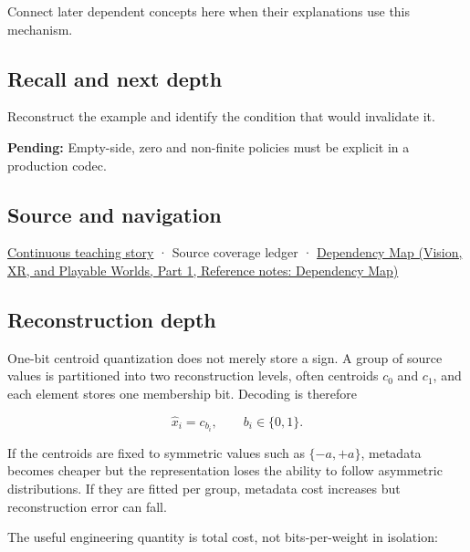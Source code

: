 Connect later dependent concepts here when their explanations use this mechanism.

\subsection{Recall and next depth}\label{appendix-4ccd7a775813-recall-and-next-depth}

\hypertarget{appendix-4ccd7a775813-recall-and-next-depth}{}

Reconstruct the example and identify the condition that would invalidate it.

\textbf{Pending:} Empty-side, zero and non-finite policies must be explicit in a production codec.

\subsection{Source and navigation}\label{appendix-4ccd7a775813-source-and-navigation}

\hypertarget{appendix-4ccd7a775813-source-and-navigation}{}

\hyperref[01-foundations-i-ch001-choosing-what-information-to-keep]{Continuous teaching story} · {Source coverage ledger} · \href{../07-Vision-XR-and-Playable-Worlds-P01/main.pdf\#nameddest=appendix-4ad47bdd269a}{Dependency Map (Vision, XR, and Playable Worlds, Part 1, Reference notes: Dependency Map)}

\subsection{Reconstruction depth}\label{appendix-4ccd7a775813-reconstruction-depth}

\hypertarget{appendix-4ccd7a775813-reconstruction-depth}{}

One-bit centroid quantization does not merely store a sign. A group of source values is partitioned into two reconstruction levels, often centroids \(c_0\) and \(c_1\), and each element stores one membership bit. Decoding is therefore

\[
\hat x_i = c_{b_i},
\qquad b_i\in\{0,1\}.
\]

If the centroids are fixed to symmetric values such as \(\{-a,+a\}\), metadata becomes cheaper but the representation loses the ability to follow asymmetric distributions. If they are fitted per group, metadata cost increases but reconstruction error can fall.

The useful engineering quantity is total cost, not bits-per-weight in isolation:

